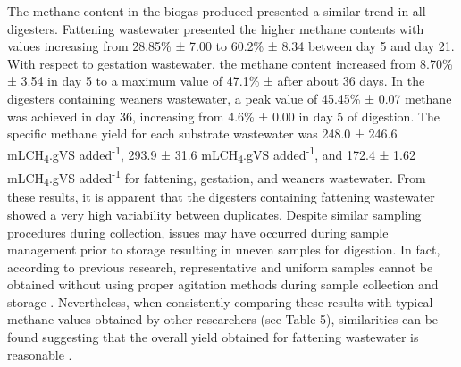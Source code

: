 The methane content in the biogas produced presented a similar trend in all digesters. Fattening wastewater presented the higher methane contents with values increasing from 28.85\% ± 7.00 to 60.2\% ± 8.34 between day 5 and day 21. With respect to gestation wastewater, the methane content increased from 8.70\% ± 3.54 in day 5 to a maximum value of 47.1\% ± after about 36 days. In the digesters containing weaners wastewater, a peak value of 45.45\% ± 0.07 methane was achieved in day 36, increasing from 4.6\% ± 0.00 in day 5 of digestion. The specific methane yield for each substrate wastewater was 248.0 ± 246.6 mLCH\textsubscript{4}.gVS added\textsuperscript{-1}, 293.9 ± 31.6 mLCH\textsubscript{4}.gVS added\textsuperscript{-1}, and 172.4 ± 1.62 mLCH\textsubscript{4}.gVS added\textsuperscript{-1} for fattening, gestation, and weaners wastewater. From these results, it is apparent that the digesters containing fattening wastewater showed a very high variability between duplicates. Despite similar sampling procedures during collection, issues may have occurred during sample management prior to storage resulting in uneven samples for digestion. In fact,  according to previous research, representative and uniform samples cannot be obtained without using proper agitation methods during sample collection and storage \cite{Zhu_2004}. Nevertheless, when consistently comparing these results with typical methane values obtained by other researchers (see Table 5), similarities can be found suggesting that the overall yield obtained for fattening wastewater is reasonable \cite{Guo_2012,Zhang_2014}.